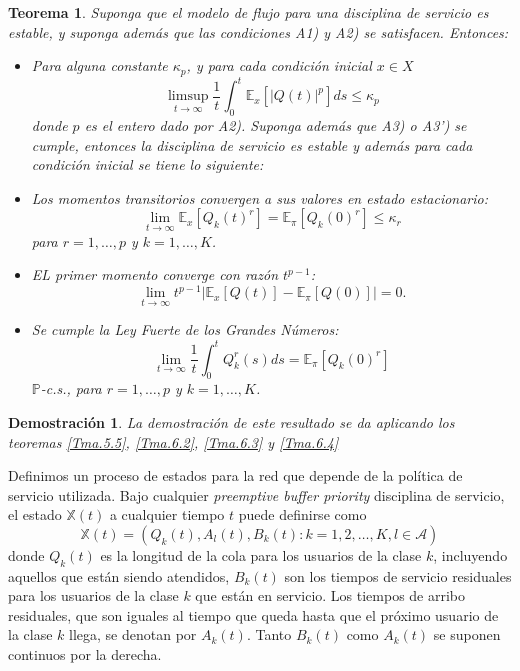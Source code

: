 \documentclass{article}
\newtheorem{Teo}{Teorema}
\newtheorem{Dem}{Demostración}
\newcommand{\esp}{\mathbb{E}}
\newcommand{\prob}{\mathbb{P}}
\begin{document}
\begin{Teo}\label{Tma.4.1}
Suponga que el modelo de flujo para una disciplina de servicio es
estable, y suponga adem\'as que las condiciones A1) y A2) se
satisfacen. Entonces:
\begin{itemize}
\item[i)] Para alguna constante $\kappa_{p}$, y para cada
condici\'on inicial $x\in X$
\begin{equation}
\limsup_{t\rightarrow\infty}\frac{1}{t}\int_{0}^{t}\esp_{x}\left[|Q\left(t\right)|^{p}\right]ds\leq\kappa_{p}
\end{equation}
donde $p$ es el entero dado por A2). Suponga adem\'as que A3) o A3')
se cumple, entonces la disciplina de servicio es estable y adem\'as
para cada condici\'on inicial se tiene lo siguiente: \item[ii)] Los
momentos transitorios convergen a sus valores en estado
estacionario:
\begin{equation}
\lim_{t\rightarrow\infty}\esp_{x}\left[Q_{k}\left(t\right)^{r}\right]=\esp_{\pi}\left[Q_{k}\left(0\right)^{r}\right]\leq\kappa_{r}
\end{equation}
para $r=1,\ldots,p$ y $k=1,\ldots,K$. \item[iii)] EL primer
momento converge con raz\'on $t^{p-1}$:
\begin{equation}
\lim_{t\rightarrow\infty}t^{p-1}|\esp_{x}\left[Q\left(t\right)\right]-\esp_{\pi}\left[Q\left(0\right)\right]|=0.
\end{equation}
\item[iv)] Se cumple la Ley Fuerte de los Grandes N\'umeros:
\begin{equation}
\lim_{t\rightarrow\infty}\frac{1}{t}\int_{0}^{t}Q_{k}^{r}\left(s\right)ds=\esp_{\pi}\left[Q_{k}\left(0\right)^{r}\right]
\end{equation}
$\prob$-c.s., para $r=1,\ldots,p$ y $k=1,\ldots,K$.
\end{itemize}
\end{Teo}
\begin{Dem}
La demostraci\'on de este resultado se da aplicando los teoremas
\ref{Tma.5.5}, \ref{Tma.6.2}, \ref{Tma.6.3} y \ref{Tma.6.4}
\end{Dem}


Definimos un proceso de estados para la red que depende de la
pol\'itica de servicio utilizada. Bajo cualquier {\em preemptive
buffer priority} disciplina de servicio, el estado
$\mathbb{X}\left(t\right)$ a cualquier tiempo $t$ puede definirse
como
\begin{equation}\label{Eq.Esp.Estados}
\mathbb{X}\left(t\right)=\left(Q_{k}\left(t\right),A_{l}\left(t\right),B_{k}\left(t\right):k=1,2,\ldots,K,l\in\mathcal{A}\right)
\end{equation}
donde $Q_{k}\left(t\right)$ es la longitud de la cola para los
usuarios de la clase $k$, incluyendo aquellos que est\'an siendo
atendidos, $B_{k}\left(t\right)$ son los tiempos de servicio
residuales para los usuarios de la clase $k$ que est\'an en
servicio. Los tiempos de arribo residuales, que son iguales al
tiempo que queda hasta que el pr\'oximo usuario de la clase $k$
llega, se denotan por $A_{k}\left(t\right)$. Tanto
$B_{k}\left(t\right)$ como $A_{k}\left(t\right)$ se suponen
continuos por la derecha.
\end{document}
